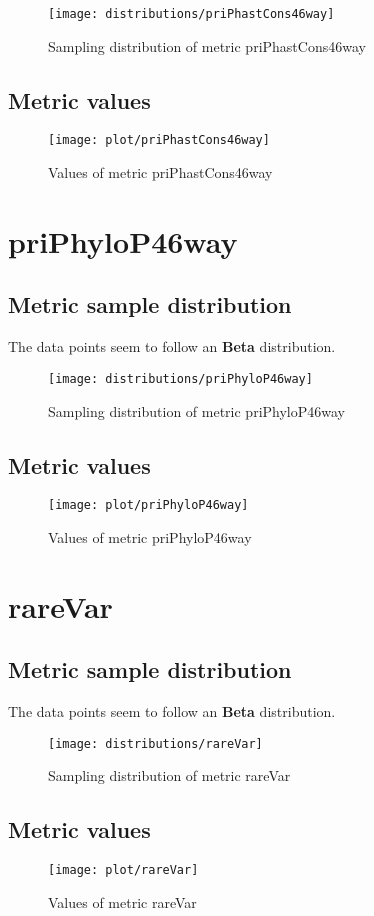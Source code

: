 \documentclass[\main/main.tex]{subfiles}
\begin{document}
\begin{figure}
  \texttt{[image: distributions/priPhastCons46way]}
  \caption{Sampling distribution of metric priPhastCons46way}
\end{figure}
\subsection{Metric values}
\begin{figure}
  \texttt{[image: plot/priPhastCons46way]}
  \caption{Values of metric priPhastCons46way}
\end{figure}

\clearpage
\section{priPhyloP46way}
\subsection{Metric sample distribution}
The data points seem to follow an \textbf{Beta} distribution.
\begin{figure}
  \texttt{[image: distributions/priPhyloP46way]}
  \caption{Sampling distribution of metric priPhyloP46way}
\end{figure}
\subsection{Metric values}
\begin{figure}
  \texttt{[image: plot/priPhyloP46way]}
  \caption{Values of metric priPhyloP46way}
\end{figure}

\clearpage
\section{rareVar}
\subsection{Metric sample distribution}
The data points seem to follow an \textbf{Beta} distribution.
\begin{figure}
  \texttt{[image: distributions/rareVar]}
  \caption{Sampling distribution of metric rareVar}
\end{figure}
\subsection{Metric values}
\begin{figure}
  \texttt{[image: plot/rareVar]}
  \caption{Values of metric rareVar}
\end{figure}
\end{document}
